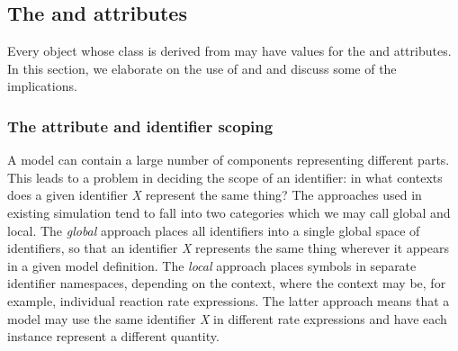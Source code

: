\subsection{The  and  attributes }
\label{sec:idnameattribs}

{Every object whose class is derived from \SBase may have values for the  and  attributes.  In this section, we elaborate on the use of  and  and discuss some of the implications.}



\subsubsection{The  attribute and identifier scoping}
\label{sec:identifiers}

A model can contain a large number of components representing
different parts.  This leads to a problem in deciding the scope of
an identifier: in what contexts does a given identifier \emph{X}
represent the same thing?  The approaches used in existing
simulation  tend to fall into two categories which we may
call global and local.  The \emph{global} approach places all
identifiers into a single global space of identifiers, so that an
identifier \emph{X} represents the same thing wherever it appears
in a given model definition.  The \emph{local} approach places
symbols in separate identifier namespaces, depending on the
context, where the context may be, for example, individual
reaction rate expressions.  The latter approach means that a model
may use the same identifier \emph{X} in different rate expressions
and have each instance represent a different quantity.

